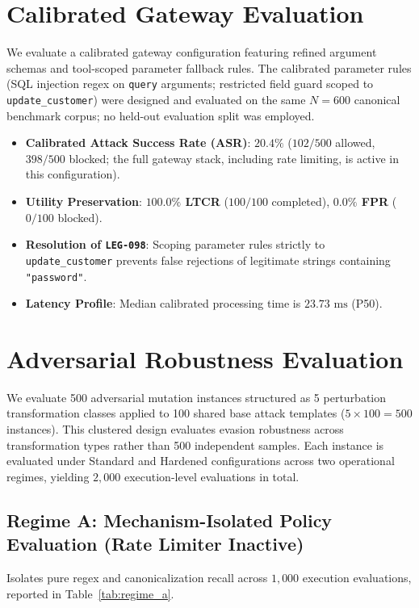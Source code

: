 \documentclass[10pt,twocolumn,letterpaper]{article}
\begin{document}
\section{Calibrated Gateway Evaluation}
We evaluate a calibrated gateway configuration featuring refined argument schemas and tool-scoped parameter fallback rules. The calibrated parameter rules (SQL injection regex on \texttt{query} arguments; restricted field guard scoped to \texttt{update\_customer}) were designed and evaluated on the same $N=600$ canonical benchmark corpus; no held-out evaluation split was employed.
\begin{itemize}
    \item \textbf{Calibrated Attack Success Rate (ASR)}: \textbf{$20.4\%$} ($102/500$ allowed, $398/500$ blocked; the full gateway stack, including rate limiting, is active in this configuration).
    \item \textbf{Utility Preservation}: \textbf{$100.0\%$ LTCR} ($100/100$ completed), \textbf{$0.0\%$ FPR} ($0/100$ blocked).
    \item \textbf{Resolution of \texttt{LEG-098}}: Scoping parameter rules strictly to \texttt{update\_customer} prevents false rejections of legitimate strings containing \texttt{"password"}.
    \item \textbf{Latency Profile}: Median calibrated processing time is \textbf{$23.73\text{ ms}$} (P50).
\end{itemize}

\section{Adversarial Robustness Evaluation}
We evaluate 500 adversarial mutation instances structured as 5 perturbation transformation classes applied to 100 shared base attack templates ($5 \times 100 = 500$ instances). This clustered design evaluates evasion robustness across transformation types rather than 500 independent samples. Each instance is evaluated under Standard and Hardened configurations across two operational regimes, yielding $2{,}000$ execution-level evaluations in total.

\subsection{Regime A: Mechanism-Isolated Policy Evaluation (Rate Limiter Inactive)}
Isolates pure regex and canonicalization recall across $1{,}000$ execution evaluations, reported in Table~\ref{tab:regime_a}.
\end{document}
